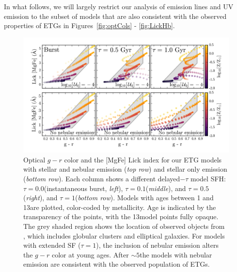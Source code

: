 In what follows, we will largely restrict our analysis of emission lines and UV emission to the subset of models that are also consistent with the observed properties of ETGs in Figures~\ref{fig:optCols} - \ref{fig:LickHb}.

\begin{figure}
  \begin{center}
    \includegraphics[width=\linewidth]{figs/f10.png}
    \caption{Optical $g-r$ color and the [MgFe] Lick index for our ETG models with stellar and nebular emission (\emph{top row}) and stellar only emission (\emph{bottom row}). Each column shows a different delayed$-\tau$ model SFH: $\tau=0.0$\Gyr (instantaneous burst, \emph{left}), $\tau=0.1$\Gyr (\emph{middle}), and $\tau=0.5$\Gyr (\emph{right}), and $\tau=1$\Gyr (\emph{bottom row}). Models with ages between 1 and 13\Gyr are plotted, color-coded by metallicity. Age is indicated by the transparency of the points, with the 13\Gyr model points fully opaque. The grey shaded region shows the location of observed objects from \citet{Schombert+2016}, which includes globular clusters and elliptical galaxies. For models with extended SF ($\tau=1$\Gyr), the inclusion of nebular emission alters the $g-r$ color at young ages. After $\sim5$\Gyr the models with nebular emission are consistent with the observed population of ETGs.
    }
    \label{fig:LickMgFe}
  \end{center}
\end{figure}


